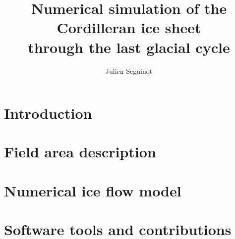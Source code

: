 \documentclass{article}
\title{Numerical simulation of the Cordilleran ice sheet \\
       through the last glacial cycle}
\author{Julien Seguinot}
\begin{document}

\maketitle
\linenumbers

\section{Introduction}
\label{sec:intro}


\section{Field area description}


\section{Numerical ice flow model}


\section{Software tools and contributions}
\end{document}
